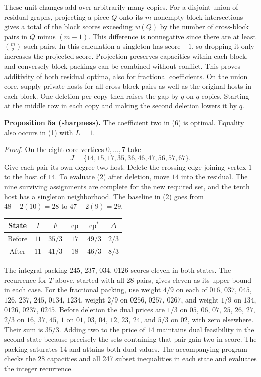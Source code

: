 \documentclass[english,11pt,a4paper]{article}
\newcounter{none}
\begin{document}
These unit changes add over arbitrarily many copies. For a disjoint union of residual graphs, projecting a piece \(Q\) onto its \(m\) nonempty block intersections gives a total of the block scores exceeding \(w(Q)\) by the number of cross-block pairs in \(Q\) minus \((m-1)\). This difference is nonnegative since there are at least \(\binom m2\) such pairs. In this calculation a singleton has score \(-1\), so dropping it only increases the projected score. Projection preserves capacities within each block, and conversely block packings can be combined without conflict. This proves additivity of both residual optima, also for fractional coefficients. On the union core, supply private hosts for all cross-block pairs as well as the original hosts in each block. One deletion per copy then raises the gap by \(q\) on \(q\) copies. Starting at the middle row in each copy and making the second deletion lowers it by \(q\).

\textbf{Proposition 5a (sharpness).} The coefficient two in (6) is optimal. Equality also occurs in (1) with \(L=1\).

\emph{Proof.} On the eight core vertices \(0,\ldots,7\) take \[
J=\{14,15,17,35,36,46,47,56,57,67\}.
\] Give each pair its own degree-two host. Delete the crossing edge joining vertex \(1\) to the host of \(14\). To evaluate (2) after deletion, move \(14\) into the residual. The nine surviving assignments are complete for the new required set, and the tenth host has a singleton neighborhood. The baseline in (2) goes from \(48-2(10)=28\) to \(47-2(9)=29\).

\begin{center}
\begin{tabular}{cccccc}
\toprule
State & $I$ & $F$ & $\operatorname{cp}$ & $\operatorname{cp}^{\ast}$ & $\Delta$ \\
\midrule
Before & $11$ & $35/3$ & $17$ & $49/3$ & $2/3$ \\
After & $11$ & $41/3$ & $18$ & $46/3$ & $8/3$ \\
\bottomrule
\end{tabular}
\end{center}

The integral packing \(245\), \(237\), \(034\), \(0126\) scores eleven in both states. The recurrence for \(T\) above, started with all 28 pairs, gives eleven as its upper bound in each case. For the fractional packing, use weight \(4/9\) on each of \(016\), \(037\), \(045\), \(126\), \(237\), \(245\), \(0134\), \(1234\), weight \(2/9\) on \(0256\), \(0257\), \(0267\), and weight \(1/9\) on \(134\), \(0126\), \(0237\), \(0245\). Before deletion the dual prices are \(1/3\) on \(05\), \(06\), \(07\), \(25\), \(26\), \(27\), \(2/3\) on \(16\), \(37\), \(45\), \(1\) on \(01\), \(03\), \(04\), \(12\), \(23\), \(24\), and \(5/3\) on \(02\), with zero elsewhere. Their sum is \(35/3\). Adding two to the price of \(14\) maintains dual feasibility in the second state because precisely the sets containing that pair gain two in score. The packing saturates \(14\) and attains both dual values. The accompanying program checks the 28 capacities and all 247 subset inequalities in each state and evaluates the integer recurrence.
\end{document}
